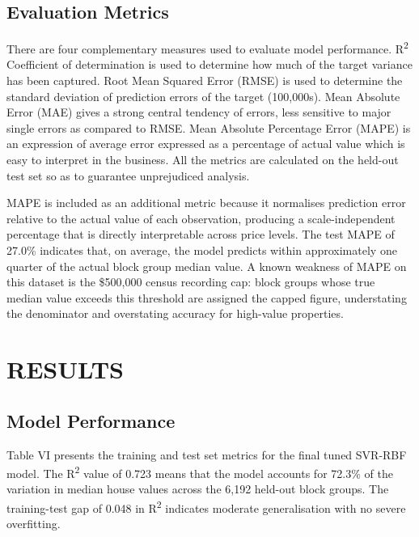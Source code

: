 \documentclass[pdflatex,sn-mathphys-num]{sn-jnl}
\begin{document}
\subsection{Evaluation Metrics}
There are four complementary measures used to evaluate model performance. R\textsuperscript{2} Coefficient of determination is used to determine how much of the target variance has been captured. Root Mean Squared Error (RMSE) is used to determine the standard deviation of prediction errors of the target (100,000s). Mean Absolute Error (MAE) gives a strong central tendency of errors, less sensitive to major single errors as compared to RMSE. Mean Absolute Percentage Error (MAPE) is an expression of average error expressed as a percentage of actual value which is easy to interpret in the business. All the metrics are calculated on the held-out test set so as to guarantee unprejudiced analysis.

MAPE is included as an additional metric because it normalises prediction error relative to the actual value of each observation, producing a scale-independent percentage that is directly interpretable across price levels. The test MAPE of 27.0\% indicates that, on average, the model predicts within approximately one quarter of the actual block group median value. A known weakness of MAPE on this dataset is the \$500,000 census recording cap: block groups whose true median value exceeds this threshold are assigned the capped figure, understating the denominator and overstating accuracy for high-value properties.




\section{RESULTS}
\subsection{Model Performance}
Table VI presents the training and test set metrics for the final tuned SVR-RBF model. The R\textsuperscript{2} value of 0.723 means that the model accounts for 72.3\% of the variation in median house values across the 6,192 held-out block groups. The training-test gap of 0.048 in R\textsuperscript{2} indicates moderate generalisation with no severe overfitting.
\end{document}
